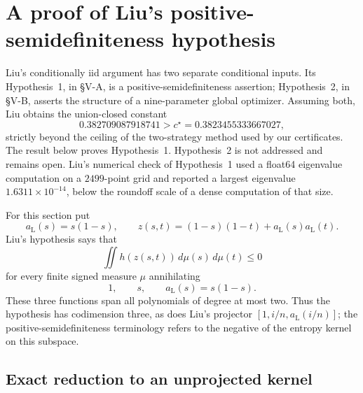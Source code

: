 \documentclass[11pt]{article}
\theoremstyle{plain}
\theoremstyle{definition}
\theoremstyle{remark}
\begin{document}
\section{A proof of Liu's positive-semidefiniteness hypothesis}
\label{sec:liu-psd}

Liu's conditionally iid argument \cite[Theorem~13 and \S V]{liu} has two
separate conditional inputs.  Its Hypothesis~1, in \S V-A, is a
positive-semidefiniteness assertion; Hypothesis~2, in \S V-B, asserts the
structure of a nine-parameter global optimizer.  Assuming both, Liu obtains
the union-closed constant
\[
0.382709087918741>c^\star=0.3823455333667027,
\]
strictly beyond the ceiling of the two-strategy method used by our
certificates.  The result below proves Hypothesis~1.  Hypothesis~2 is not
addressed and remains open.  Liu's numerical check of Hypothesis~1 used a
float64 eigenvalue computation on a $2499$-point grid and reported a largest
eigenvalue $1.6311\times10^{-14}$, below the roundoff scale of a dense
computation of that size.

For this section put
\[
a_{\mathrm L}(s)=s(1-s),\qquad
z(s,t)=(1-s)(1-t)+a_{\mathrm L}(s)a_{\mathrm L}(t).
\]
Liu's hypothesis says that
\begin{equation}
\iint h(z(s,t))\,d\mu(s)\,d\mu(t)\le0
\label{eq:liu-hypothesis}
\end{equation}
for every finite signed measure $\mu$ annihilating
\[
1,\qquad s,\qquad a_{\mathrm L}(s)=s(1-s).
\]
These three functions span all polynomials of degree at most two.  Thus the
hypothesis has codimension three, as does Liu's projector
$[1,i/n,a_{\mathrm L}(i/n)]$; the positive-semidefiniteness terminology refers
to the negative of the entropy kernel on this subspace.

\subsection{Exact reduction to an unprojected kernel}
\end{document}
